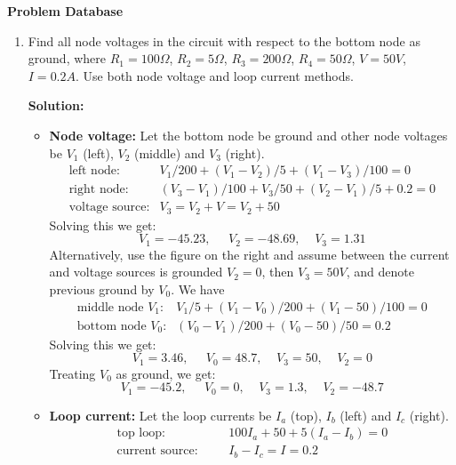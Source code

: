 \usepackage{html}

\begin{center}
{\Large \bf Problem Database}
\end{center}
\begin{enumerate}

\item Find all node voltages in the circuit with respect to the bottom node as
  ground, where $R_1=100\Omega$, $R_2=5\Omega$, $R_3=200\Omega$, $R_4=50\Omega$, 
  $V=50V$, $I=0.2A$.  Use both node voltage and loop current methods.

  
  {\bf Solution:} 
  \begin{itemize}
    \item {\bf Node voltage:} Let the bottom node be ground and other node
      voltages be $V_1$ (left), $V_2$ (middle) and $V_3$ (right).
      \[ \begin{array}{ll}
	\mbox{left node:} & V_1/200+(V_1-V_2)/5+(V_1-V_3)/100=0 \\
	\mbox{right node:} & (V_3-V_1)/100+V_3/50+(V_2-V_1)/5+0.2=0 \\
	\mbox{voltage source:} & V_3=V_2+V=V_2+50 \end{array} \]
      Solving this we get:
      \[ V_1=-45.23,\;\;\;\;\;V_2=-48.69,\;\;\;\;V_3=1.31 \]
      Alternatively, use the figure on the right and assume between the current 
      and voltage sources is grounded $V_2=0$, then $V_3=50V$, and denote previous 
      ground by $V_0$. We have
      \[ \begin{array}{ll}
	\mbox{middle node $V_1$:} & V_1/5+(V_1-V_0)/200+(V_1-50)/100=0 \\
	\mbox{bottom node $V_0$:} & (V_0-V_1)/200+(V_0-50)/50=0.2 \end{array} \]
      Solving this we get: 
      \[ V_1=3.46,\;\;\;\;\;V_0=48.7,\;\;\;\;V_3=50,\;\;\;\;V_2=0 \]
      Treating $V_0$ as ground, we get:
      \[ V_1=-45.2,\;\;\;\;\;V_0=0,\;\;\;\;V_3=1.3,\;\;\;\;V_2=-48.7 \]
    \item {\bf Loop current:} Let the loop currents be $I_a$ (top), $I_b$ (left)
      and $I_c$ (right).
      \[ \begin{array}{ll}
	\mbox{top loop:}\;\;\;\;\;\;& 100I_a+50+5(I_a-I_b)=0 \\
	\mbox{current source:}\;\;\;\;\;\;& I_b-I_c=I=0.2 \\

\end{array}\]
\end{itemize}
\end{enumerate}
